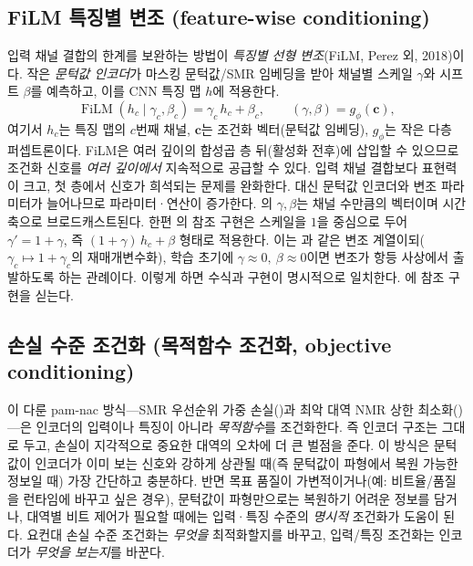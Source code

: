 \documentclass[11pt,a4paper]{article}
\begin{document}
\subsection{FiLM 특징별 변조 (feature-wise conditioning)}
입력 채널 결합의 한계를 보완하는 방법이 \emph{특징별 선형 변조}(FiLM, Perez 외,
2018\cite{film2018})이다. 작은 \emph{문턱값 인코더}가 마스킹 문턱값/SMR 임베딩을
받아 채널별 스케일 $\gamma$와 시프트 $\beta$를 예측하고, 이를 CNN 특징 맵 $h$에
적용한다.
\begin{equation}\label{eq:film}
  \operatorname{FiLM}(h_c \mid \gamma_c, \beta_c) = \gamma_c\, h_c + \beta_c,
  \qquad
  (\gamma, \beta) = g_\phi(\mathbf{c}),
\end{equation}
여기서 $h_c$는 특징 맵의 $c$번째 채널, $\mathbf{c}$는 조건화 벡터(문턱값 임베딩),
$g_\phi$는 작은 다층 퍼셉트론이다. FiLM은 여러 깊이의 합성곱 층 뒤(활성화 전후)에
삽입할 수 있으므로 조건화 신호를 \emph{여러 깊이에서} 지속적으로 공급할 수 있다.
입력 채널 결합보다 표현력이 크고, 첫 층에서 신호가 희석되는 문제를 완화한다. 대신
문턱값 인코더와 변조 파라미터가 늘어나므로 파라미터·연산이 증가한다. 의
$\gamma, \beta$는 채널 수만큼의 벡터이며 시간 축으로 브로드캐스트된다. 한편
의 참조 구현은 스케일을 $1$을 중심으로 두어
$\gamma' = 1 + \gamma$, 즉 $(1 + \gamma)\, h_c + \beta$ 형태로 적용한다. 이는
과 같은 변조 계열이되($\gamma_c \mapsto 1 + \gamma_c$의 재매개변수화),
학습 초기에 $\gamma \approx 0,\ \beta \approx 0$이면 변조가 항등 사상에서
출발하도록 하는 관례이다. 이렇게 하면 수식과 구현이 명시적으로 일치한다.
에 참조 구현을 싣는다.

\subsection{손실 수준 조건화 (목적함수 조건화, objective conditioning)}
이 다룬 pam-nac 방식---SMR 우선순위 가중 손실()과
최악 대역 NMR 상한 최소화()---은 인코더의 입력이나 특징이 아니라
\emph{목적함수}를 조건화한다. 즉 인코더 구조는 그대로 두고, 손실이 지각적으로
중요한 대역의 오차에 더 큰 벌점을 준다. 이 방식은 문턱값이 인코더가 이미 보는
신호와 강하게 상관될 때(즉 문턱값이 파형에서 복원 가능한 정보일 때) 가장 간단하고
충분하다. 반면 목표 품질이 가변적이거나(예: 비트율/품질을 런타임에 바꾸고 싶은
경우), 문턱값이 파형만으로는 복원하기 어려운 정보를 담거나, 대역별 비트 제어가
필요할 때에는 입력·특징 수준의 \emph{명시적} 조건화가 도움이 된다. 요컨대 손실
수준 조건화는 \emph{무엇을} 최적화할지를 바꾸고, 입력/특징 조건화는 인코더가
\emph{무엇을 보는지}를 바꾼다.
\end{document}

